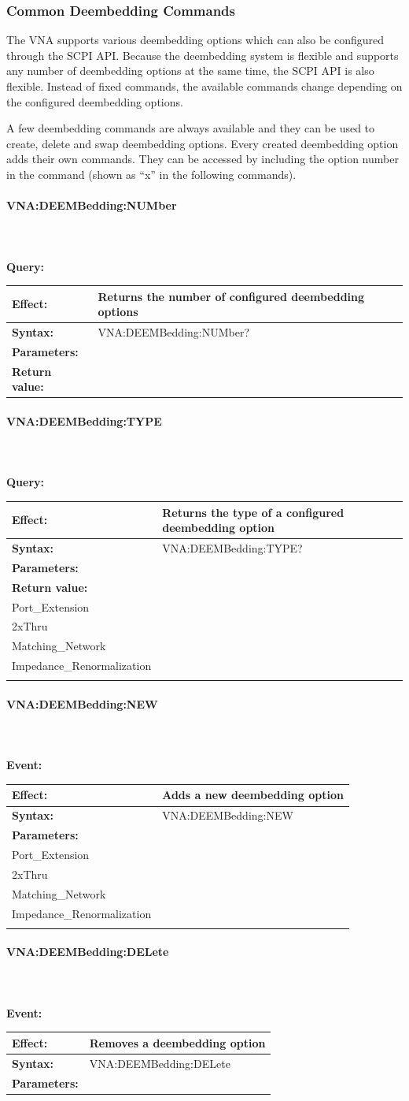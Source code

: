 \documentclass[a4paper,11pt]{article}
\newcommand{\subsubsubsection}[1]{\paragraph{#1}\mbox{}\\\\}
\newcommand{\event}[3]{
\noindent\textbf{Event:}
\begin{longtable}{p{.15\textwidth} | p{.80\textwidth} } 
\hline
\textbf{Effect:} & #1 \\ \hline
\textbf{Syntax:} & #2 \\ \hline 
\textbf{Parameters:} & \makecell[Xl]{#3} \\ \hline
\end{longtable}
}
\newcommand{\query}[4]{
\noindent\textbf{Query:}
\begin{longtable}{p{.15\textwidth} | p{.80\textwidth} } 
\hline
\textbf{Effect:} & #1 \\ \hline
\textbf{Syntax:} & #2 \\ \hline 
\textbf{Parameters:} & \makecell[tl]{#3} \\ \hline
\textbf{Return value:} & \makecell[tl]{#4} \\ \hline
\end{longtable}
}
\begin{document}
\subsubsection{Common Deembedding Commands}
The VNA supports various deembedding options which can also be configured through the SCPI API. Because the deembedding system is flexible and supports any number of deembedding options at the same time, the SCPI API is also flexible. Instead of fixed commands, the available commands change depending on the configured deembedding options.

A few deembedding commands are always available and they can be used to create, delete and swap deembedding options. Every created deembedding option adds their own commands. They can be accessed by including the option number in the command (shown as ``x'' in the following commands).

\subsubsubsection{VNA:DEEMBedding:NUMber}
\query{Returns the number of configured deembedding options}{VNA:DEEMBedding:NUMber?}{None}{<number of deembedding options>}

\subsubsubsection{VNA:DEEMBedding:TYPE}
\query{Returns the type of a configured deembedding option}{VNA:DEEMBedding:TYPE?}{<x> Number of deembedding option}{Type of option, one of:\\
\hspace{1cm}Port\_Extension\\
\hspace{1cm}2xThru\\
\hspace{1cm}Matching\_Network\\
\hspace{1cm}Impedance\_Renormalization\\}

\subsubsubsection{VNA:DEEMBedding:NEW}
\event{Adds a new deembedding option}{VNA:DEEMBedding:NEW}{<type> Type of option, one of:\\
\hspace{1cm}Port\_Extension\\
\hspace{1cm}2xThru\\
\hspace{1cm}Matching\_Network\\
\hspace{1cm}Impedance\_Renormalization\\}

\subsubsubsection{VNA:DEEMBedding:DELete}
\event{Removes a deembedding option}{VNA:DEEMBedding:DELete}{<x> Number of option to delete}
\end{document}
